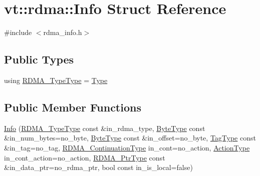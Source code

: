 \hypertarget{structvt_1_1rdma_1_1_info}{}\section{vt\+:\+:rdma\+:\+:Info Struct Reference}
\label{structvt_1_1rdma_1_1_info}


{\ttfamily \#include $<$rdma\+\_\+info.\+h$>$}

\subsection*{Public Types}
\begin{DoxyCompactItemize}
\item 
using \hyperlink{structvt_1_1rdma_1_1_info_afb608063c839ec0e8e124f3496542991}{R\+D\+M\+A\+\_\+\+Type\+Type} = \hyperlink{namespacevt_1_1rdma_ac848e1d9da43db6294bd06f83e5d3946}{Type}
\end{DoxyCompactItemize}
\subsection*{Public Member Functions}
\begin{DoxyCompactItemize}
\item 
\hyperlink{structvt_1_1rdma_1_1_info_a9f79490fb7f166889a8cfed10d158d38}{Info} (\hyperlink{namespacevt_1_1rdma_ac848e1d9da43db6294bd06f83e5d3946}{R\+D\+M\+A\+\_\+\+Type\+Type} const \&in\+\_\+rdma\+\_\+type, \hyperlink{namespacevt_aab8d55968084610ce3b17057981e9300}{Byte\+Type} const \&in\+\_\+num\+\_\+bytes=no\+\_\+byte, \hyperlink{namespacevt_aab8d55968084610ce3b17057981e9300}{Byte\+Type} const \&in\+\_\+offset=no\+\_\+byte, \hyperlink{namespacevt_a84ab281dae04a52a4b243d6bf62d0e52}{Tag\+Type} const \&in\+\_\+tag=no\+\_\+tag, \hyperlink{namespacevt_a9880273f1697d78c2171f8d8f044de51}{R\+D\+M\+A\+\_\+\+Continuation\+Type} in\+\_\+cont=no\+\_\+action, \hyperlink{namespacevt_ae0a5a7b18cc99d7b732cb4d44f46b0f3}{Action\+Type} in\+\_\+cont\+\_\+action=no\+\_\+action, \hyperlink{namespacevt_a9e2c953286c7616f7c218e9951790776}{R\+D\+M\+A\+\_\+\+Ptr\+Type} const \&in\+\_\+data\+\_\+ptr=no\+\_\+rdma\+\_\+ptr, bool const in\+\_\+is\+\_\+local=false)
\end{DoxyCompactItemize}
